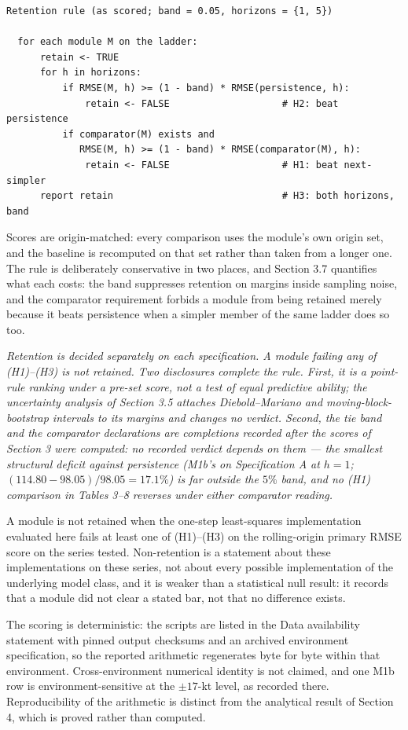\documentclass[11pt]{article}
\begin{document}
\begin{verbatim}
Retention rule (as scored; band = 0.05, horizons = {1, 5})

  for each module M on the ladder:
      retain <- TRUE
      for h in horizons:
          if RMSE(M, h) >= (1 - band) * RMSE(persistence, h):
              retain <- FALSE                    # H2: beat persistence
          if comparator(M) exists and
             RMSE(M, h) >= (1 - band) * RMSE(comparator(M), h):
              retain <- FALSE                    # H1: beat next-simpler
      report retain                              # H3: both horizons, band
\end{verbatim}

Scores are origin-matched: every comparison uses the module's own origin
set, and the baseline is recomputed on that set rather than taken from a
longer one. The rule is deliberately conservative in two places, and
Section 3.7 quantifies what each costs: the band suppresses retention on
margins inside sampling noise, and the comparator requirement forbids a
module from being retained merely because it beats persistence when a
simpler member of the same ladder does so too.

\emph{Retention is decided separately on each specification. A module
failing any of (H1)--(H3) is not retained. Two disclosures complete the
rule. First, it is a point-rule ranking under a pre-set score, not a
test of equal predictive ability; the uncertainty analysis of
Section 3.5 attaches Diebold--Mariano and moving-block-bootstrap
intervals to its margins and changes no verdict. Second, the tie band
and the comparator declarations are completions recorded after the
scores of Section 3 were computed: no recorded verdict depends on them
--- the smallest structural deficit against persistence (M1b's on
Specification A at \(h=1\); \((114.80-98.05)/98.05 = 17.1\%\)) is far
outside the \(5\%\) band, and no (H1) comparison in Tables
3--8 reverses under either comparator reading.}

A module is not retained when the one-step least-squares implementation
evaluated here fails at least one of (H1)--(H3) on the rolling-origin
primary RMSE score on the series tested. Non-retention is a statement
about these implementations on these series, not about every possible
implementation of the underlying model class, and it is weaker than a
statistical null result: it records that a module did not clear a stated
bar, not that no difference exists.

The scoring is deterministic: the scripts are listed in the Data
availability statement with pinned output checksums and an archived
environment specification, so the reported arithmetic regenerates byte
for byte within that environment. Cross-environment numerical
identity is not claimed, and one M1b row is environment-sensitive at
the \(\pm 17\)-kt level, as recorded there.
Reproducibility of the arithmetic is distinct from the analytical result
of Section 4, which is proved rather than computed.
\end{document}
